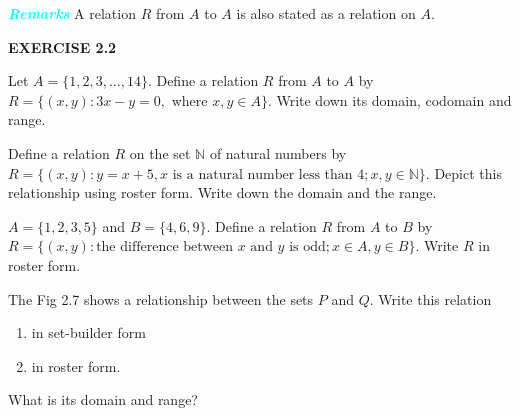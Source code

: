 \documentclass[11pt]{article}
\begin{document}
\noindent
\begin{minipage}[t]{\linewidth}
\colorbox{ncertblue}{\textcolor{cyan}{\textbf{\textit{Remarks}}}}
 A relation $R$ from $A$ to $A$ is also stated as a relation on $A$.
\end{minipage}

\begin{center}
\begin{tcolorbox}[
  enhanced,
  width=0.25\textwidth,   
  colback=cyan!20,
  colframe=cyan!80!black,
  boxrule=1.2pt,
  arc=0mm,                
  left=10pt,
  right=10pt,
  top=8pt,
  bottom=8pt
]
\centering
\textbf{\textcolor{cyan!80!black}{EXERCISE 2.2}}
\end{tcolorbox}
\end{center}


\begin{enumerate}
    \item Let $A = \{1, 2, 3, \dots, 14\}$. Define a relation $R$ from $A$ to $A$ by $R = \{(x, y) : 3x - y = 0, \text{ where } x, y \in A\}$. Write down its domain, codomain and range.

    \item Define a relation $R$ on the set $\mathbb{N}$ of natural numbers by $R = \{(x, y) : y = x + 5, x \text{ is a natural number less than } 4; x, y \in \mathbb{N}\}$. Depict this relationship using roster form. Write down the domain and the range.

    \item $A = \{1, 2, 3, 5\}$ and $B = \{4, 6, 9\}$. Define a relation $R$ from $A$ to $B$ by $R = \{(x, y) : \text{the difference between } x \text{ and } y \text{ is odd}; x \in A, y \in B\}$. Write $R$ in roster form.

    \vspace{10pt}
   
    \begin{minipage}[t]{0.6\textwidth}
        \item The Fig 2.7 shows a relationship between the sets $P$ and $Q$. Write this relation
        \begin{enumerate}
            \item[(i)] in set-builder form
            \item[(ii)] in roster form.
        \end{enumerate}
        What is its domain and range?


\end{minipage}
\end{enumerate}
\end{document}
